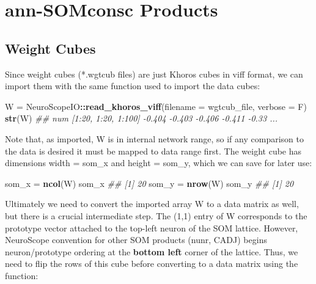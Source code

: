 \documentclass[]{article}
\newenvironment{Shaded}{\begin{snugshade}}{\end{snugshade}}
\newcommand{\CommentTok}[1]{\textcolor[rgb]{0.56,0.35,0.01}{\textit{#1}}}
\newcommand{\DataTypeTok}[1]{\textcolor[rgb]{0.13,0.29,0.53}{#1}}
\newcommand{\KeywordTok}[1]{\textcolor[rgb]{0.13,0.29,0.53}{\textbf{#1}}}
\newcommand{\NormalTok}[1]{#1}
\newcommand{\OperatorTok}[1]{\textcolor[rgb]{0.81,0.36,0.00}{\textbf{#1}}}
\newcommand{\StringTok}[1]{\textcolor[rgb]{0.31,0.60,0.02}{#1}}
\begin{document}
\hypertarget{ann-somconsc-products}{%
\section{ann-SOMconsc Products}\label{ann-somconsc-products}}

\hypertarget{weight-cubes}{%
\subsection{Weight Cubes}\label{weight-cubes}}

Since weight cubes (*.wgtcub files) are just Khoros cubes in viff format, we can import them with the same function used to import the data cubes:

\begin{Shaded}
\begin{Highlighting}[]
\NormalTok{W =}\StringTok{ }\NormalTok{NeuroScopeIO}\OperatorTok{::}\KeywordTok{read_khoros_viff}\NormalTok{(}\DataTypeTok{filename =}\NormalTok{ wgtcub_file, }\DataTypeTok{verbose =}\NormalTok{ F)}
\KeywordTok{str}\NormalTok{(W)}
\CommentTok{##  num [1:20, 1:20, 1:100] -0.404 -0.403 -0.406 -0.411 -0.33 ...}
\end{Highlighting}
\end{Shaded}

Note that, as imported, W is in internal network range, so if any comparison to the data is desired it must be mapped to data range first. The weight cube has dimensions width = som\_x and height = som\_y, which we can save for later use:

\begin{Shaded}
\begin{Highlighting}[]
\NormalTok{som_x =}\StringTok{ }\KeywordTok{ncol}\NormalTok{(W)}
\NormalTok{som_x}
\CommentTok{## [1] 20}
\NormalTok{som_y =}\StringTok{ }\KeywordTok{nrow}\NormalTok{(W)}
\NormalTok{som_y}
\CommentTok{## [1] 20}
\end{Highlighting}
\end{Shaded}

Ultimately we need to convert the imported array W to a data matrix as well, but there is a crucial intermediate step. The (1,1) entry of W corresponds to the prototype vector attached to the top-left neuron of the SOM lattice. However, NeuroScope convention for other SOM products (nunr, CADJ) begins neuron/prototype ordering at the \textbf{bottom left} corner of the lattice. Thus, we need to flip the rows of this cube before converting to a data matrix using the function:
\end{document}

